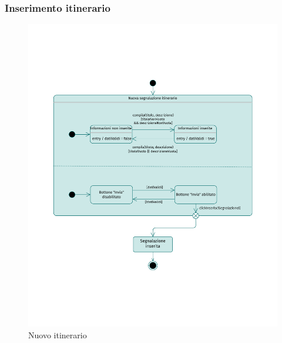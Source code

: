 \documentclass{natourDoc}
\begin{document}
	\newpage
	\subsubsection{Inserimento itinerario}
	\begin{figure}[!htbp]
		\centering
		\includegraphics[width=\textwidth, page=2]{./diagrams/statechart.pdf}
		\caption{Nuovo itinerario}
	\end{figure}
	\FloatBarrier

	\newpage
\end{document}
